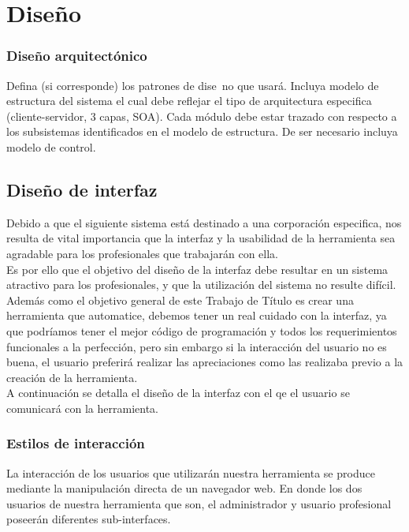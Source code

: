 \chapter{Diseño}
\label{capdiseno}


\subsection{Diseño arquitectónico} \label{disenoarq}
Defina (si corresponde) los patrones de dise~no que usará. Incluya modelo de estructura
del sistema el cual debe reflejar el tipo de arquitectura especifica (cliente-servidor,
3 capas, SOA). Cada módulo debe estar trazado con respecto a los subsistemas identificados en el modelo de estructura.
De ser necesario incluya modelo de control.


\section{Diseño de interfaz} \label{disenoint}

Debido a que el siguiente sistema está destinado a una corporación especifica, nos resulta de vital importancia que la interfaz y la usabilidad de la herramienta sea agradable para los profesionales que trabajarán con ella.\\
Es por ello que el objetivo del diseño de la interfaz debe resultar en un sistema atractivo para los profesionales, y que la utilización del sistema no resulte difícil.\\
Además como el objetivo general de este Trabajo de Título es crear una herramienta que automatice, debemos tener un real cuidado con la interfaz, ya que podríamos tener el mejor código de programación y todos los requerimientos funcionales a la perfección, pero sin embargo si la interacción del usuario no es buena, el usuario preferirá realizar las apreciaciones como las realizaba previo a la creación de la herramienta.\\
A continuación se detalla el diseño de la interfaz con el qe el usuario se comunicará con la herramienta. 

\subsection{Estilos de interacción}

La interacción de los usuarios que utilizarán nuestra herramienta se produce mediante la manipulación directa de un navegador web. En donde los dos usuarios de nuestra herramienta que son, el administrador y usuario profesional poseerán diferentes sub-interfaces.


